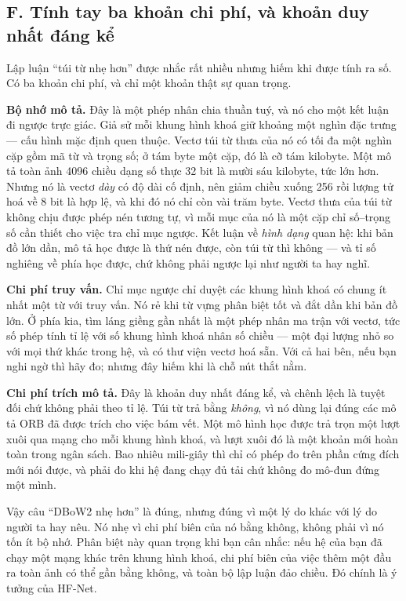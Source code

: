 \documentclass[../../deep_learning.tex]{subfiles}
\begin{document}
\subsection{F. Tính tay ba khoản chi phí, và khoản duy nhất đáng kể}
Lập luận ``túi từ nhẹ hơn'' được nhắc rất nhiều nhưng hiếm khi được tính ra số. Có ba khoản chi phí, và chỉ một khoản thật sự quan trọng.

\textbf{Bộ nhớ mô tả.} Đây là một phép nhân chia thuần tuý, và nó cho một kết luận đi ngược trực giác. Giả sử mỗi khung hình khoá giữ khoảng một nghìn đặc trưng --- cấu hình mặc định quen thuộc. Vectơ túi từ thưa của nó có tối đa một nghìn cặp gồm mã từ và trọng số; ở tám byte một cặp, đó là cỡ tám kilobyte. Một mô tả toàn ảnh 4096 chiều dạng số thực 32 bit là mười sáu kilobyte, tức lớn hơn. Nhưng nó là vectơ \emph{dày} có độ dài cố định, nên giảm chiều xuống 256 rồi lượng tử hoá về 8 bit là hợp lệ, và khi đó nó chỉ còn vài trăm byte. Vectơ thưa của túi từ không chịu được phép nén tương tự, vì mỗi mục của nó là một cặp chỉ số--trọng số cần thiết cho việc tra chỉ mục ngược. Kết luận về \emph{hình dạng} quan hệ: khi bản đồ lớn dần, mô tả học được là thứ nén được, còn túi từ thì không --- và tỉ số nghiêng về phía học được, chứ không phải ngược lại như người ta hay nghĩ.

\textbf{Chi phí truy vấn.} Chỉ mục ngược chỉ duyệt các khung hình khoá có chung ít nhất một từ với truy vấn. Nó rẻ khi từ vựng phân biệt tốt và đắt dần khi bản đồ lớn. Ở phía kia, tìm láng giềng gần nhất là một phép nhân ma trận với vectơ, tức số phép tính tỉ lệ với số khung hình khoá nhân số chiều --- một đại lượng nhỏ so với mọi thứ khác trong hệ, và có thư viện vectơ hoá sẵn. Với cả hai bên, nếu bạn nghi ngờ thì hãy đo; nhưng đây hiếm khi là chỗ nút thắt nằm.

\textbf{Chi phí trích mô tả.} Đây là khoản duy nhất đáng kể, và chênh lệch là tuyệt đối chứ không phải theo tỉ lệ. Túi từ trả bằng \emph{không}, vì nó dùng lại đúng các mô tả ORB đã được trích cho việc bám vết. Một mô hình học được trả trọn một lượt xuôi qua mạng cho mỗi khung hình khoá, và lượt xuôi đó là một khoản mới hoàn toàn trong ngân sách. Bao nhiêu mili-giây thì chỉ có phép đo trên phần cứng đích mới nói được, và phải đo khi hệ đang chạy đủ tải chứ không đo mô-đun đứng một mình.

Vậy câu ``DBoW2 nhẹ hơn'' là đúng, nhưng đúng vì một lý do khác với lý do người ta hay nêu. Nó nhẹ vì chi phí biên của nó bằng không, không phải vì nó tốn ít bộ nhớ. Phân biệt này quan trọng khi bạn cân nhắc: nếu hệ của bạn đã chạy một mạng khác trên khung hình khoá, chi phí biên của việc thêm một đầu ra toàn ảnh có thể gần bằng không, và toàn bộ lập luận đảo chiều. Đó chính là ý tưởng của HF-Net.
\end{document}
